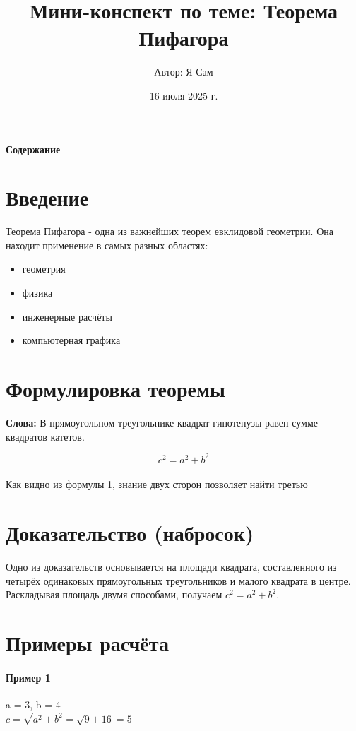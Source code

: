 \documentclass{article}
\title{Мини-конспект по теме: Теорема Пифагора}
\author{Автор: Я Сам }
\date{16 июля 2025 г.}
\begin{document}
\maketitle
\paragraph{Содержание}
\tableofcontents{}

\newpage

\section{Введение}
Теорема Пифагора - одна из важнейших теорем евклидовой геометрии. Она находит применение в самых разных областях:
\begin{itemize}
    \item геометрия
    \item физика
    \item инженерные расчёты
    \item компьютерная графика
\end{itemize}
\section{Формулировка теоремы}
\textbf{Слова:} В прямоугольном треугольнике квадрат гипотенузы равен сумме квадратов катетов.
\begin{center}
    \begin{equation}
    c^2 = a^2 + b^2
    \end{equation}
    \\
    Как видно из формулы 1, знание двух сторон позволяет найти третью
\end{center}
\section{Доказательство (набросок)}
\begin{center}
    Одно из доказательств основывается на площади квадрата, составленного из четырёх одинаковых прямоугольных треугольников и малого квадрата в центре. Раскладывая площадь двумя способами, получаем $c^2 = a^2 + b^2$.
\end{center}
\section{Примеры расчёта}
\paragraph{Пример 1}
\begin{center}
    a = 3, b = 4\\
    $c = \sqrt{a^2 + b^2} = \sqrt{9 + 16} = 5$
\end{center}
\end{document}
